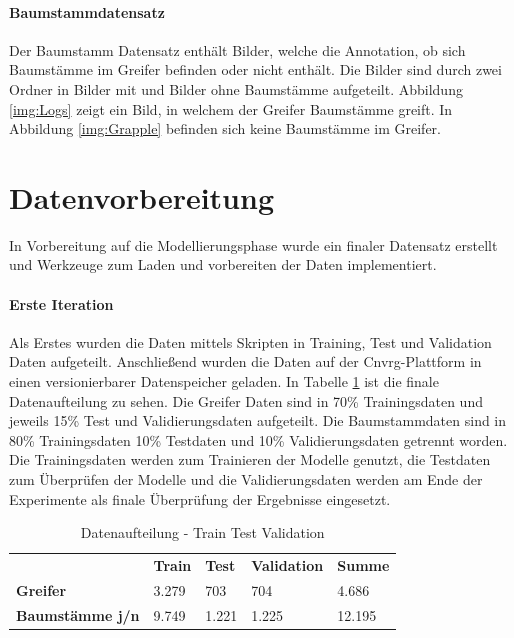 	\paragraph{Baumstammdatensatz} Der Baumstamm Datensatz enthält Bilder, welche die Annotation, ob sich Baumstämme im Greifer befinden oder nicht enthält. Die Bilder sind durch zwei Ordner in Bilder mit und Bilder ohne Baumstämme aufgeteilt. Abbildung \ref{img:Logs} zeigt ein Bild, in welchem der Greifer Baumstämme greift. In Abbildung \ref{img:Grapple} befinden sich keine Baumstämme im Greifer.  
			
	\section{Datenvorbereitung}
	\label{sec:DataPreparation}
	In Vorbereitung auf die Modellierungsphase wurde ein finaler Datensatz erstellt und Werkzeuge zum Laden und vorbereiten der Daten implementiert.
	\paragraph{Erste Iteration} Als Erstes wurden die Daten mittels Skripten in Training, Test und Validation Daten aufgeteilt. Anschließend wurden die Daten auf der Cnvrg-Plattform in einen versionierbarer Datenspeicher geladen. In Tabelle \ref{table:DatenaufteilungTrainTestValidation} ist die finale Datenaufteilung zu sehen. Die Greifer Daten sind in 70\% Trainingsdaten und jeweils 15\% Test und Validierungsdaten aufgeteilt. Die Baumstammdaten sind in 80\% Trainingsdaten 10\% Testdaten und 10\% Validierungsdaten getrennt worden. Die Trainingsdaten werden zum Trainieren der Modelle genutzt, die Testdaten zum Überprüfen der Modelle und die Validierungsdaten werden am Ende der Experimente als finale Überprüfung der Ergebnisse eingesetzt.
	\begin{table}[ht]
		\centering
		\begin{tabularx}{\textwidth}{lllll}
			& \textbf{Train} & \textbf{Test}  & \textbf{Validation} & \textbf{Summe} 	 \\
			\textbf{Greifer} 				 & 	3.279			& 703	 & 704				   & 4.686 	\\
			\textbf{Baumstämme j/n}	 	  &  9.749	   & 1.221 	& 1.225	& 12.195\\		
		\end{tabularx}
		\caption{Datenaufteilung - Train Test Validation}
		\label{table:DatenaufteilungTrainTestValidation}
	\end{table}
	
